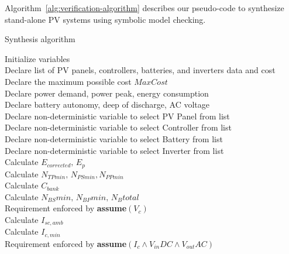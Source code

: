 \documentclass[review]{elsarticle}
\begin{document}
Algorithm~\ref{alg:verification-algorithm} describes our pseudo-code to synthesize stand-alone PV systems using symbolic model checking. 
%
 \begin{algorithm}
 \caption{Synthesis algorithm}
 \begin{algorithmic}[1]
 \renewcommand{\algorithmicrequire}{\textbf{Input:}}
 \renewcommand{\algorithmicensure}{\textbf{Output:}}
  \STATE Initialize variables \\
  \STATE Declare list of PV panels, controllers, batteries, and inverters data and cost \\
  \STATE Declare the maximum possible cost $MaxCost$  \\
  \STATE Declare power demand, power peak, energy consumption \\
  \STATE Declare battery autonomy, deep of discharge, AC voltage \\
 	\STATE Declare non-deterministic variable to select PV Panel from list \\
 	\STATE Declare non-deterministic variable to select Controller from list \\
 	\STATE Declare non-deterministic variable to select Battery from list \\
 	\STATE Declare non-deterministic variable to select Inverter from list \\ 	
 	\STATE Calculate $E_{corrected}, \, E_{p} $ \\
	\STATE Calculate $N_{TPmin}, \, N_{PSmin}, N_{PPmin} $ \\
 	\STATE Calculate $C_{bank}$ \\
	\STATE Calculate $N_{BS}min, \, N_{BP}min, \, N_{B}total$ \\
	\STATE Requirement enforced by \textbf{assume}$(V_{c})$ \\
 	\STATE Calculate $I_{sc,amb}$ \\
 	\STATE Calculate $I_{c,min}$ \\
 	\STATE Requirement enforced by \textbf{assume}$(I_{c} \wedge V_{in}DC \wedge V_{out}AC)$ \\

\end{algorithmic}
\end{algorithm}
\end{document}
